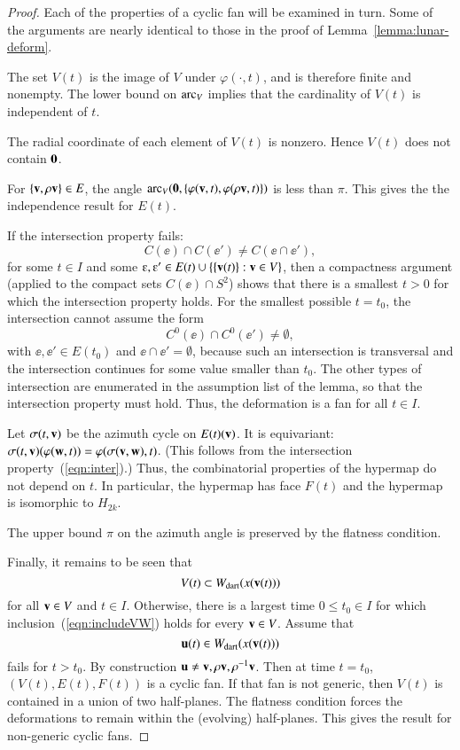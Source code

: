 \begin{proof}
Each of the properties of a cyclic fan will be examined in turn.  Some of the arguments are nearly identical to those in the proof of Lemma~\ref{lemma:lunar-deform}.

  The set $V(t)$ is the image of $V$ under $\varphi(\cdot,t)$, and is therefore finite and nonempty. The lower bound on ${\operatorname{arc}}_V$ implies that the cardinality of $V(t)$ is independent of $t$.

  The radial coordinate of each element of $V(t)$ is nonzero.  Hence $V(t)$ does not contain ${\mathbf 0}$.

  For $\{{\mathbf v},\rho {\mathbf v}\}\in E$, the angle 
${\operatorname{arc}}_V({\mathbf 0},\{\varphi({\mathbf v},t),\varphi(\rho {\mathbf v},t)\})$ is less than $\pi$.
This gives the
the independence result for $E(t)$.

 If the intersection property fails:
$$
C(\ee) \cap C(\ee') \ne C(\ee \cap \ee'),
$$
for some $t\in I$ and some $\ee,\ee'\in E(t)\cup \{\{\v(t)\}: \v\in V\}$,
then a compactness argument (applied to the compact sets $C(\ee)\cap S^2$)
shows that there is a smallest $t>0$ for which the intersection property
holds.  For the smallest possible $t=t_0$, the intersection cannot assume
the form
\begin{equation}\label{eqn:inter}
C^0(\ee) \cap C^0(\ee') \ne \emptyset,
\end{equation}
with $\ee,\ee'\in E(t_0)$ and $\ee\cap \ee'=\emptyset$, because such an intersection is transversal and the intersection continues for some value smaller than $t_0$.  The other types of intersection are enumerated in the assumption list of the lemma, so that the intersection property must hold.  Thus, the deformation is a fan for all $t\in I$.

   Let $\sigma(t,{\mathbf v})$ be the azimuth cycle on $E(t)({\mathbf v})$.  It is equivariant:  $\sigma(t,{\mathbf v}) (\varphi({\mathbf w},t)) = \varphi(\sigma({\mathbf v},{\mathbf w}),t)$.   (This follows from the intersection property~(\ref{eqn:inter}).)  Thus, the combinatorial properties of the hypermap do not depend on $t$.  In particular, the hypermap has face $F(t)$ and the hypermap is isomorphic to $H_{2k}$.

  The upper bound $\pi$ on the azimuth angle is preserved by the flatness condition.

  Finally, it remains to be seen that 
\begin{equation}\label{eqn:includeVW}
V(t)\subset W_{\text{dart}}(x({\mathbf v}(t)))
\end{equation} 
for all ${\mathbf v}\in V$ and $t\in I$.  Otherwise, there is a largest time $0\le t_0\in I$ for which inclusion~(\ref{eqn:includeVW}) holds for every ${\mathbf v}\in V$.  Assume that
$$
{\mathbf u}(t)\in W_{\text{dart}}(x({\mathbf v}(t)))
$$ 
fails for $t>t_0$.  By construction ${\mathbf u}\ne {\mathbf v},\rho {\mathbf v},\rho^{-1} {\mathbf v}$.  
Then at time $t=t_0$, $(V(t),E(t),F(t))$ is a cyclic fan.  If that fan is not generic, then $V(t)$ is contained in a union of two half-planes.  The flatness condition forces the deformations to remain within the (evolving) half-planes. This gives the result for non-generic cyclic fans.  


\end{proof}
